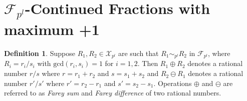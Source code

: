 \documentclass[12pt]{elsarticle}
\newtheorem{lemma}[theorem]{Lemma}
\newtheorem{corollary}[theorem]{Corollary}
\theoremstyle{definition}
\newtheorem{defi}{Definition}
\newcommand{\field}[1]{\mathbb{#1}}          \newcommand{\Q}{\field{Q}}
\newcommand{\N}{\field{N}}
\newcommand{\mX}{{\mathcal X}}
\newcommand{\f}{{\mathcal F}}
\begin{document}
\section{ $\f_{p^l}$-Continued Fractions with maximum +1}
\begin{defi}
	Suppose $ R_1,R_2\in\mX_{p^l}$ are such that $R_1\sim_{p^l} R_2$ in $\f_{{p^l}}$, where $R_i=r_i/s_i$ with $\mathrm{gcd}(r_i,s_i)=1$ for $i=1,2$. Then $R_1\oplus R_2$ denotes a rational number  $r/s$ where $r=r_1+r_2$ and $s=s_1+s_2$ and $R_2\ominus R_1$ denotes a rational number  $r'/s'$ where $r'=r_2-r_1$ and $s'=s_2-s_1.$ Operations $\oplus$ and $\ominus$ are referred to as \textit{Farey sum} and \textit{Farey difference} of two rational numbers. 
\end{defi}
%
%
%
%
\end{document}
